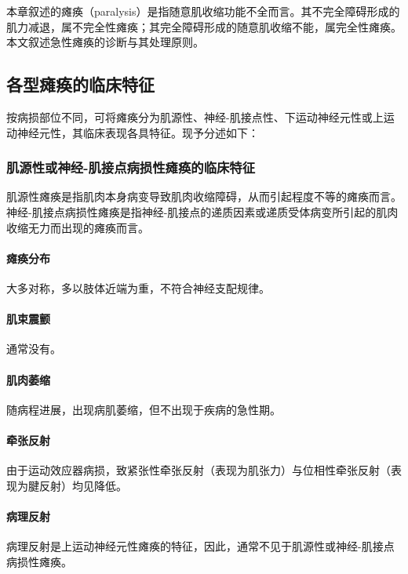 本章叙述的瘫痪（paralysis）是指随意肌收缩功能不全而言。其不完全障碍形成的肌力减退，属不完全性瘫痪；其完全障碍形成的随意肌收缩不能，属完全性瘫痪。本文叙述急性瘫痪的诊断与其处理原则。

\subsection{各型瘫痪的临床特征}

按病损部位不同，可将瘫痪分为肌源性、神经-肌接点性、下运动神经元性或上运动神经元性，其临床表现各具特征。现予分述如下：

\subsubsection{肌源性或神经-肌接点病损性瘫痪的临床特征}

肌源性瘫痪是指肌肉本身病变导致肌肉收缩障碍，从而引起程度不等的瘫痪而言。神经-肌接点病损性瘫痪是指神经-肌接点的递质因素或递质受体病变所引起的肌肉收缩无力而出现的瘫痪而言。

\paragraph{瘫痪分布}

大多对称，多以肢体近端为重，不符合神经支配规律。

\paragraph{肌束震颤}

通常没有。

\paragraph{肌肉萎缩}

随病程进展，出现病肌萎缩，但不出现于疾病的急性期。

\paragraph{牵张反射}

由于运动效应器病损，致紧张性牵张反射（表现为肌张力）与位相性牵张反射（表现为腱反射）均见降低。

\paragraph{病理反射}

病理反射是上运动神经元性瘫痪的特征，因此，通常不见于肌源性或神经-肌接点病损性瘫痪。

